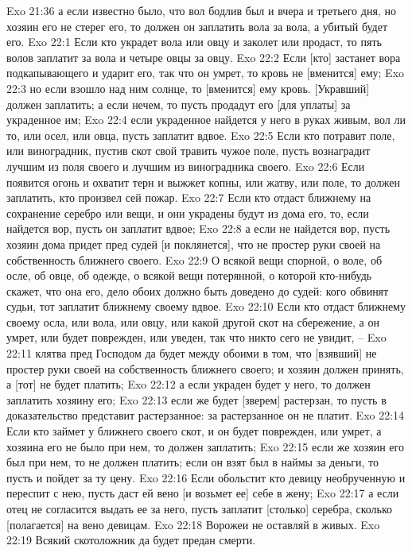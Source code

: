 Exo 21:36  а если известно было, что вол бодлив был и вчера и третьего дня, но хозяин его не стерег его, то должен он заплатить вола за вола, а убитый будет его.
Exo 22:1  Если кто украдет вола или овцу и заколет или продаст, то пять волов заплатит за вола и четыре овцы за овцу.
Exo 22:2  Если [кто] застанет вора подкапывающего и ударит его, так что он умрет, то кровь не [вменится] ему;
Exo 22:3  но если взошло над ним солнце, то [вменится] ему кровь. [Укравший] должен заплатить; а если нечем, то пусть продадут его [для уплаты] за украденное им;
Exo 22:4  если украденное найдется у него в руках живым, вол ли то, или осел, или овца, пусть заплатит вдвое.
Exo 22:5  Если кто потравит поле, или виноградник, пустив скот свой травить чужое поле, пусть вознаградит лучшим из поля своего и лучшим из виноградника своего.
Exo 22:6  Если появится огонь и охватит терн и выжжет копны, или жатву, или поле, то должен заплатить, кто произвел сей пожар.
Exo 22:7  Если кто отдаст ближнему на сохранение серебро или вещи, и они украдены будут из дома его, то, если найдется вор, пусть он заплатит вдвое;
Exo 22:8  а если не найдется вор, пусть хозяин дома придет пред судей [и поклянется], что не простер руки своей на собственность ближнего своего.
Exo 22:9  О всякой вещи спорной, о воле, об осле, об овце, об одежде, о всякой вещи потерянной, о которой кто-нибудь скажет, что она его, дело обоих должно быть доведено до судей: кого обвинят судьи, тот заплатит ближнему своему вдвое.
Exo 22:10  Если кто отдаст ближнему своему осла, или вола, или овцу, или какой другой скот на сбережение, а он умрет, или будет поврежден, или уведен, так что никто сего не увидит, --
Exo 22:11  клятва пред Господом да будет между обоими в том, что [взявший] не простер руки своей на собственность ближнего своего; и хозяин должен принять, а [тот] не будет платить;
Exo 22:12  а если украден будет у него, то должен заплатить хозяину его;
Exo 22:13  если же будет [зверем] растерзан, то пусть в доказательство представит растерзанное: за растерзанное он не платит.
Exo 22:14  Если кто займет у ближнего своего скот, и он будет поврежден, или умрет, а хозяина его не было при нем, то должен заплатить;
Exo 22:15  если же хозяин его был при нем, то не должен платить; если он взят был в наймы за деньги, то пусть и пойдет за ту цену.
Exo 22:16  Если обольстит кто девицу необрученную и переспит с нею, пусть даст ей вено [и возьмет ее] себе в жену;
Exo 22:17  а если отец не согласится выдать ее за него, пусть заплатит [столько] серебра, сколько [полагается] на вено девицам.
Exo 22:18  Ворожеи не оставляй в живых.
Exo 22:19  Всякий скотоложник да будет предан смерти.
